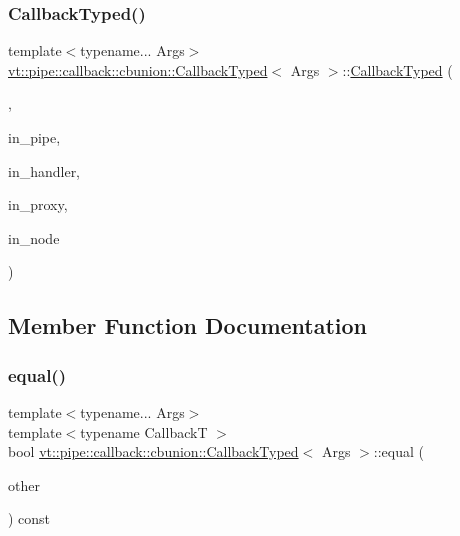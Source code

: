 \subsubsection{\texorpdfstring{Callback\+Typed()}{CallbackTyped()}\hspace{0.1cm}{\footnotesize\ttfamily [12/12]}}
{\footnotesize\ttfamily template$<$typename... Args$>$ \\
\hyperlink{structvt_1_1pipe_1_1callback_1_1cbunion_1_1_callback_typed}{vt\+::pipe\+::callback\+::cbunion\+::\+Callback\+Typed}$<$ Args $>$\+::\hyperlink{structvt_1_1pipe_1_1callback_1_1cbunion_1_1_callback_typed}{Callback\+Typed} (\begin{DoxyParamCaption}\item[{Raw\+Send\+Obj\+Grp\+Tag\+Type}]{,  }\item[{\hyperlink{namespacevt_ac9852acda74d1896f48f406cd72c7bd3}{Pipe\+Type}}]{in\+\_\+pipe,  }\item[{\hyperlink{namespacevt_af64846b57dfcaf104da3ef6967917573}{Handler\+Type}}]{in\+\_\+handler,  }\item[{\hyperlink{namespacevt_ad7cae989df485fccca57f0792a880a8e}{Obj\+Group\+Proxy\+Type}}]{in\+\_\+proxy,  }\item[{\hyperlink{namespacevt_a866da9d0efc19c0a1ce79e9e492f47e2}{Node\+Type}}]{in\+\_\+node }\end{DoxyParamCaption})\hspace{0.3cm}{\ttfamily [inline]}}



\subsection{Member Function Documentation}
\mbox{\label{structvt_1_1pipe_1_1callback_1_1cbunion_1_1_callback_typed_ae71e236d0851fa19672e2777edfe81dd}} 
\subsubsection{\texorpdfstring{equal()}{equal()}}
{\footnotesize\ttfamily template$<$typename... Args$>$ \\
template$<$typename CallbackT $>$ \\
bool \hyperlink{structvt_1_1pipe_1_1callback_1_1cbunion_1_1_callback_typed}{vt\+::pipe\+::callback\+::cbunion\+::\+Callback\+Typed}$<$ Args $>$\+::equal (\begin{DoxyParamCaption}\item[{CallbackT const \&}]{other }\end{DoxyParamCaption}) const\hspace{0.3cm}{\ttfamily [inline]}}

